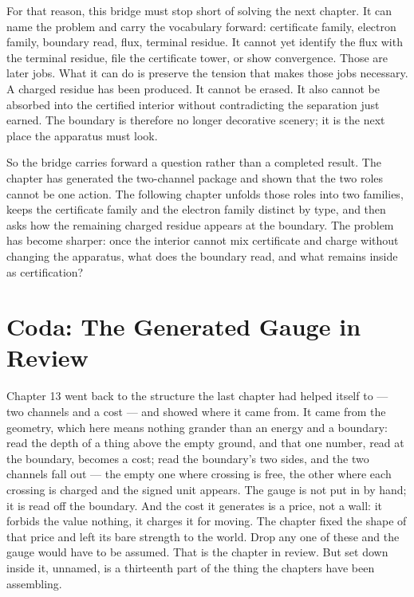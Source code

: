 For that reason, this bridge must stop short of solving the next chapter. It can
name the problem and carry the vocabulary forward: certificate family, electron
family, boundary read, flux, terminal residue. It cannot yet identify the flux
with the terminal residue, file the certificate tower, or show convergence.
Those are later jobs. What it can do is preserve the tension that makes those
jobs necessary. A charged residue has been produced. It cannot be erased. It
also cannot be absorbed into the certified interior without contradicting the
separation just earned. The boundary is therefore no longer decorative scenery;
it is the next place the apparatus must look.

So the bridge carries forward a question rather than a completed result. The
chapter has generated the two-channel package and shown that the two roles
cannot be one action. The following chapter unfolds those roles into two
families, keeps the certificate family and the electron family distinct by type,
and then asks how the remaining charged residue appears at the boundary. The
problem has become sharper: once the interior cannot mix certificate and charge
without changing the apparatus, what does the boundary read, and what remains
inside as certification?

\section*{Coda: The Generated Gauge in Review}

Chapter 13 went back to the structure the last chapter had helped itself to --- two channels and a cost --- and showed where it came from. It came from the geometry, which here means nothing grander than an energy and a boundary: read the depth of a thing above the empty ground, and that one number, read at the boundary, becomes a cost; read the boundary's two sides, and the two channels fall out --- the empty one where crossing is free, the other where each crossing is charged and the signed unit appears. The gauge is not put in by hand; it is read off the boundary. And the cost it generates is a price, not a wall: it forbids the value nothing, it charges it for moving. The chapter fixed the shape of that price and left its bare strength to the world. Drop any one of these and the gauge would have to be assumed. That is the chapter in review. But set down inside it, unnamed, is a thirteenth part of the thing the chapters have been assembling.

